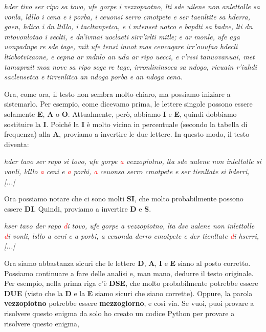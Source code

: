 \documentclass{report}
\begin{document}
\vspace{0.2cm}

\textit{hder tivo ser ripo sa tovo, ufe gorpe i vezzopaotno, lti sde uilene non anlettolle
sa vonla, ldllo i cena e i porba, i ceuonsi serro cmotpete e ser taenltite sa hderra,
gaen, hdica i dn ltillo, i tacltanpetca, e i mtenset uotco e bapdti sa badve, lti dn
mtovonlotao i seclti, e dn’ivmai uoclaeti sirr’irlti mitle; e ar monle, ufe aga uonpadnpe
re sde tage, mit ufe tensi inuot mas cencaqare irr’ouufao hdecli lticbotvizaone, e cepna
ar mdnlo an uda ar ripo uecci, e r’rssi tanuovanuai, met tamaprait moa nove sa ripo soge
re tage, irronlininsoca sa ndogo, ricuain r’iuhdi saclensetca e tirrenlitca an ndoga
porba e an ndoga cena.}
\vspace{0.2cm}

Ora, come ora, il testo non sembra molto chiaro, ma possiamo iniziare a sistemarlo.  
Per esempio, come dicevamo prima, le lettere singole possono essere solamente \textbf{E}, \textbf{A} o \textbf{O}.  
Attualmente, però, abbiamo \textbf{I} e \textbf{E}, quindi dobbiamo sostituire la \textbf{I}.  
Poiché la \textbf{I} è molto vicina in percentuale (secondo la tabella di frequenza) alla \textbf{A}, proviamo a invertire le due lettere.  
In questo modo, il testo diventa:

\vspace{0.2cm}
\textit{hder tavo ser rapo si tovo, ufe gorpe \textcolor{red}{a} vezzopiotno, lta sde ualene non inlettolle
si vonli, ldllo \textcolor{red}{a} ceni e \textcolor{red}{a} porbi, \textcolor{red}{a} ceuonsa serro cmotpete e ser tienltate si hderri, [...]}
\vspace{0.2cm}

Ora possiamo notare che ci sono molti \textbf{SI}, che molto probabilmente possono essere \textbf{DI}.  
Quindi, proviamo a invertire \textbf{D} e \textbf{S}.

\vspace{0.2cm}
\textit{hser tavo der rapo \textcolor{red}{d}i tovo, ufe gorpe a vezzopiotno, lta dse ualene non inlettolle
\textcolor{red}{d}i vonli, lsllo a ceni e a porbi, a ceuonda derro cmotpete e der tienltate \textcolor{red}{d}i hserri, [...]}\vspace{0.2cm}

Ora siamo abbastanza sicuri che le lettere \textbf{D}, \textbf{A}, \textbf{I} e \textbf{E} siano al posto corretto.  
Possiamo continuare a fare delle analisi e, man mano, dedurre il testo originale.  
Per esempio, nella prima riga c'è \textbf{DSE}, che molto probabilmente potrebbe essere \textbf{DUE} (visto che la \textbf{D} e la \textbf{E} siamo sicuri che siano corrette).  
Oppure, la parola \textbf{vezzopiotno} potrebbe essere \textbf{mezzogiorno}, e così via.  
Se vuoi, puoi provare a risolvere questo enigma da solo ho creato un codice Python per provare a risolvere questo enigma, 
\end{document}

